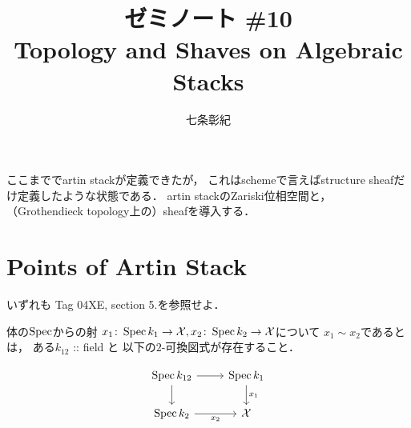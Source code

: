 


\title{ゼミノート \#10 \\ Topology and Shaves on Algebraic Stacks}
\author{七条彰紀}
\maketitle
\tableofcontents
\vspace{10pt}

ここまででartin stackが定義できたが，
これはschemeで言えばstructure sheafだけ定義したような状態である．
artin stackのZariski位相空間と，
（Grothendieck topology上の）sheafを導入する．

\section{Points of Artin Stack}
いずれも\cite{SP} Tag 04XE, \cite{LMB} section 5.を参照せよ．

\begin{Def}
    体の$\operatorname{Spec}$からの射
    $x_1 \colon \operatorname{Spec} k_1 \to \mathcal{X}, x_2 \colon \operatorname{Spec} k_2 \to \mathcal{X}$について
    $x_1 \sim x_2$であるとは，
    ある$k_{12}$ ::  field と
    以下の$2$-可換図式が存在すること．

    \[
    \begin{tikzcd}
        \Spec k_{12} \ar[d]\ar[r]& \Spec k_{1} \ar[d, "x_1"] \\
        \Spec k_{2} \ar[r, "x_2"']& \stX
    \end{tikzcd}
    \]
\end{Def}

